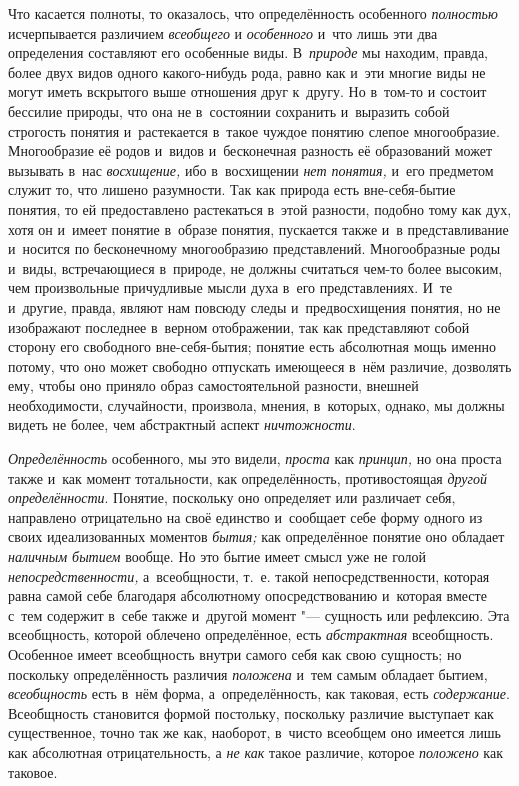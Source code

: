 Что касается полноты, то оказалось, что определённость особенного
{\em полностью} исчерпывается различием {\em всеобщего} и {\em особенного}
и~что лишь эти два определения составляют его особенные виды.
В~{\em природе} мы находим,
правда, более двух видов одного какого-нибудь рода, равно как и~эти многие
виды не могут иметь вскрытого выше отношения друг к~другу. Но в~том-то и
состоит бессилие природы, что она не в~состоянии сохранить и~выразить собой
строгость понятия и~растекается в~такое чуждое понятию слепое многообразие.
Многообразие её родов и~видов и~бесконечная разность её образований может
вызывать в~нас {\em восхищение,} ибо в~восхищении {\em нет
понятия,} и~его предметом служит то, что лишено разумности.
Так как природа есть вне-себя-бытие понятия, то ей предоставлено
растекаться в~этой разности, подобно тому как дух, хотя он и~имеет понятие
в~образе понятия, пускается также и~в представливание и~носится по
бесконечному многообразию представлений. Многообразные роды и~виды,
встречающиеся в~природе, не должны считаться чем-то более высоким, чем
произвольные причудливые мысли духа в~его представлениях. И~те и~другие,
правда, являют нам повсюду следы и~предвосхищения понятия, но не изображают
последнее в~верном отображении, так как представляют собой сторону его
свободного вне-себя-бытия; понятие есть абсолютная мощь именно потому, что
оно может свободно отпускать имеющееся в~нём различие, дозволять ему, чтобы
оно приняло образ самостоятельной разности, внешней необходимости,
случайности, произвола, мнения, в~которых, однако, мы должны видеть не
более, чем абстрактный аспект {\em ничтожности}.

{\em Определённость} особенного, мы это видели, {\em проста} как {\em принцип,}
но она проста также и~как момент тотальности, как определённость,
противостоящая {\em другой определённости}.
Понятие, поскольку оно определяет или различает себя,
направлено отрицательно на своё единство и~сообщает себе форму одного из
своих идеализованных моментов {\em бытия;} как
определённое понятие оно обладает {\em наличным бытием}
вообще. Но это бытие имеет смысл уже не голой {\em непосредственности,}
а~всеобщности, т.~е. такой непосредственности, которая равна
самой себе благодаря абсолютному опосредствованию и~которая вместе с~тем
содержит в~себе также и~другой момент "--- сущность или
рефлексию. Эта всеобщность, которой облечено определённое, есть
{\em абстрактная} всеобщность. Особенное имеет всеобщность внутри самого себя
как свою сущность; но поскольку определённость различия {\em положена} и~тем
самым обладает бытием, {\em всеобщность} есть
в~нём форма, а~определённость, как таковая, есть {\em содержание}.
Всеобщность становится формой постольку, поскольку различие
выступает как существенное, точно так же как, наоборот, в~чисто всеобщем
оно имеется лишь как абсолютная отрицательность, а {\em не как} такое
различие, которое {\em положено} как таковое.

